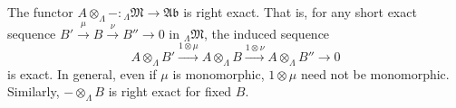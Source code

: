 The functor $A \otimes_\Lambda - : {}_\Lambda\mathfrak{M} \to \mathfrak{Ab}$ is right exact. That is, for any short exact sequence $B' \xrightarrow{\mu} B \xrightarrow{\nu} B'' \to 0$ in ${}_\Lambda\mathfrak{M}$, the induced sequence
$$
A \otimes_\Lambda B' \xrightarrow{1 \otimes \mu} A \otimes_\Lambda B \xrightarrow{1 \otimes \nu} A \otimes_\Lambda B'' \to 0
$$
is exact. In general, even if $\mu$ is monomorphic, $1 \otimes \mu$ need not be monomorphic. Similarly, $- \otimes_\Lambda B$ is right exact for fixed $B$.

